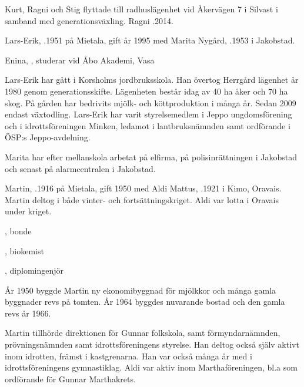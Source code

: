 Kurt, Ragni och Stig flyttade till radhuslägenhet vid Åkervägen 7 i Silvast i samband med generationsväxling. Ragni .2014.






Lars-Erik, .1951 på Mietala, gift år 1995 med Marita Nygård, .1953 i Jakobstad.
\begin{jhchildren}
  \item Enina, , studerar vid Åbo Akademi, Vasa
\end{jhchildren}

Lars-Erik har gått i Korsholms jordbruksskola. Han övertog Herrgård	lägenhet år 1980 genom generationsskifte. Lägenheten består idag av 40 ha åker och 70 ha skog. På gården har bedrivits mjölk- och köttproduktion i många år. Sedan 2009 endast växtodling. Lars-Erik har varit styrelsemedlem i Jeppo ungdomsförening och i idrottsföreningen Minken, ledamot i lantbruksnämnden samt ordförande i ÖSP:s Jeppo-avdelning.

Marita har efter mellanskola arbetat på elfirma, på polisinrättningen i Jakobstad och senast på alarmcentralen i Jakobstad.


Martin, .1916 på Mietala, gift 1950 med Aldi  Mattus, .1921 i Kimo, Oravais. Martin deltog i både vinter- och fortsättningskriget. Aldi var lotta i Oravais under kriget.
\begin{jhchildren}
  \item {}, bonde
  \item {}, biokemist
  \item {}, diplomingenjör
\end{jhchildren}

År 1950 byggde Martin ny ekonomibyggnad för mjölkkor och många gamla byggnader revs på tomten. År 1964 byggdes nuvarande bostad och den gamla revs år 1966.

Martin tillhörde direktionen för Gunnar folkskola, samt förmyndarnämnden, prövningsnämnden samt idrottsföreningens styrelse. Han deltog också själv aktivt inom idrotten, främst i kastgrenarna. Han var också många år med i idrottsföreningens gymnastiklag. Aldi var aktiv inom Marthaföreningen, bl.a som ordförande för Gunnar Marthakrets.

